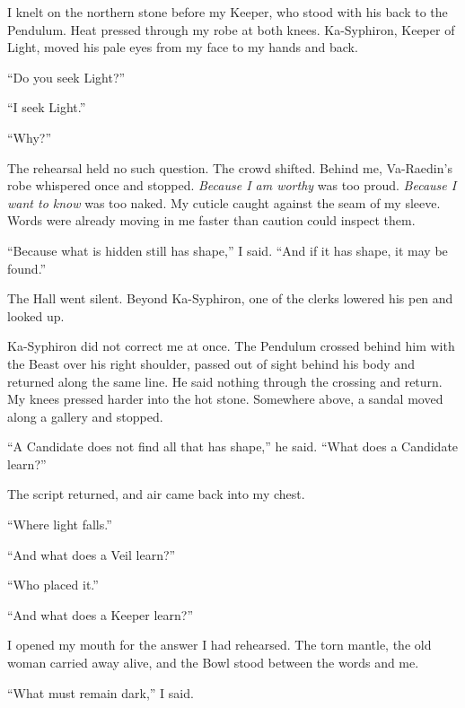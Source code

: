 I knelt on the northern stone before my Keeper, who stood with his back to the Pendulum. Heat pressed through my robe at both knees. Ka-Syphiron, Keeper of Light, moved his pale eyes from my face to my hands and back.\par

``Do you seek Light?''\par
``I seek Light.''\par
``Why?''\par

The rehearsal held no such question. The crowd shifted. Behind me, Va-Raedin's robe whispered once and stopped. \textit{Because I am worthy} was too proud. \textit{Because I want to know} was too naked. My cuticle caught against the seam of my sleeve. Words were already moving in me faster than caution could inspect them.\par

``Because what is hidden still has shape,'' I said. ``And if it has shape, it may be found.''\par

The Hall went silent. Beyond Ka-Syphiron, one of the clerks lowered his pen and looked up.\par

Ka-Syphiron did not correct me at once. The Pendulum crossed behind him with the Beast over his right shoulder, passed out of sight behind his body and returned along the same line. He said nothing through the crossing and return. My knees pressed harder into the hot stone. Somewhere above, a sandal moved along a gallery and stopped.\par

``A Candidate does not find all that has shape,'' he said. ``What does a Candidate learn?''\par

The script returned, and air came back into my chest.\par

``Where light falls.''\par
``And what does a Veil learn?''\par
``Who placed it.''\par
``And what does a Keeper learn?''\par

I opened my mouth for the answer I had rehearsed. The torn mantle, the old woman carried away alive, and the Bowl stood between the words and me.\par

``What must remain dark,'' I said.\par

